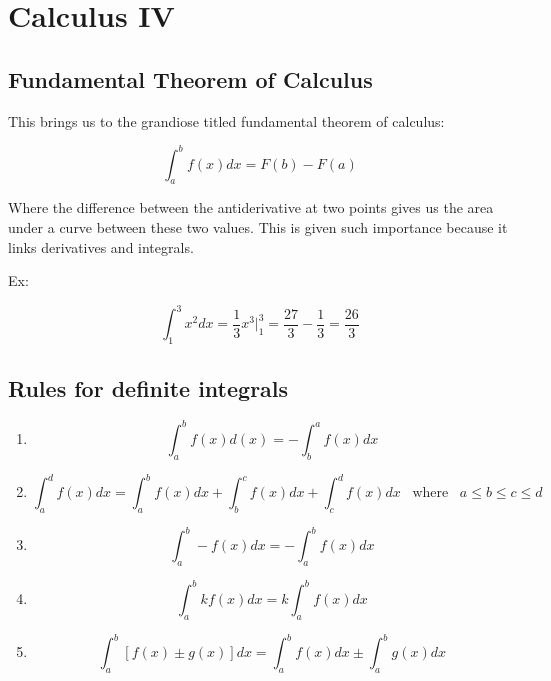 \section{Calculus IV}

\subsection{Fundamental Theorem of Calculus}

This brings us to the grandiose titled fundamental theorem of calculus: 

\vspace{-1em}
\begin{equation*}
    \int_a^b f(x)dx = F(b) - F(a)
\end{equation*}

\noindent Where the difference between the antiderivative at two points gives us the area under a curve between these two values. This is given such importance because it links derivatives and integrals. 

\noindent Ex:

\begin{equation*}
    \int_1^3 x^2dx = \frac{1}{3}x^3 \Big\rvert_1^3 = \frac{27}{3} - \frac{1}{3} = \frac{26}{3}
\end{equation*}

\subsection{Rules for definite integrals}

\begin{enumerate}
    \item \begin{equation*}
        \int_a^b f(x)d(x) = - \int_b^a f(x)dx
    \end{equation*}
    
    \item \begin{equation*}
        \int_a^d f(x)dx = \int_a^b f(x)dx + \int_b^c f(x)dx + \int_c^d f(x)dx \, \, \, \text{ where } \, \, \, a \leq b \leq c \leq d
    \end{equation*}

    \item \begin{equation*}
        \int_a^b - f(x)dx = - \int_a^b f(x)dx
    \end{equation*}

    \item \begin{equation*}
        \int_a^b k f(x)dx = k \int_a^b f(x)dx
    \end{equation*}

    \item \begin{equation*}
        \int_a^b \left[f(x) \pm g(x)\right]dx = \int_a^b f(x)dx \pm \int_a^b g(x)dx
    \end{equation*}
\end{enumerate}

